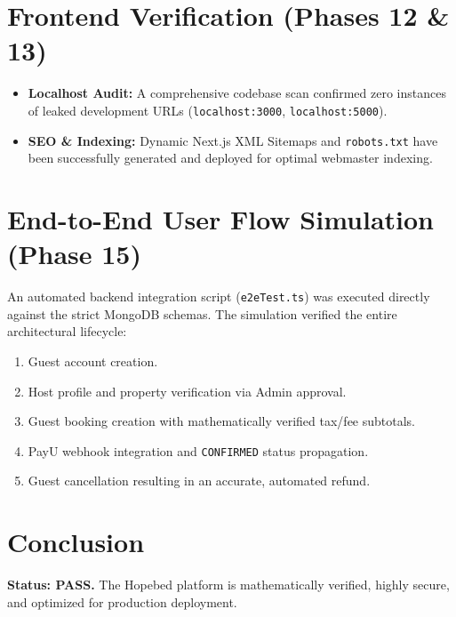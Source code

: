 \documentclass[12pt,a4paper]{article}
\begin{document}
\section{Frontend Verification (Phases 12 \& 13)}
\begin{itemize}[label=\checkmark]
    \item \textbf{Localhost Audit:} A comprehensive codebase scan confirmed zero instances of leaked development URLs (\texttt{localhost:3000}, \texttt{localhost:5000}).
    \item \textbf{SEO \& Indexing:} Dynamic Next.js XML Sitemaps and \texttt{robots.txt} have been successfully generated and deployed for optimal webmaster indexing.
\end{itemize}

\section{End-to-End User Flow Simulation (Phase 15)}
An automated backend integration script (\texttt{e2eTest.ts}) was executed directly against the strict MongoDB schemas. The simulation verified the entire architectural lifecycle:
\begin{enumerate}
    \item Guest account creation.
    \item Host profile and property verification via Admin approval.
    \item Guest booking creation with mathematically verified tax/fee subtotals.
    \item PayU webhook integration and \texttt{CONFIRMED} status propagation.
    \item Guest cancellation resulting in an accurate, automated refund.
\end{enumerate}

\section*{Conclusion}
\textbf{Status: PASS.} The Hopebed platform is mathematically verified, highly secure, and optimized for production deployment.
\end{document}
